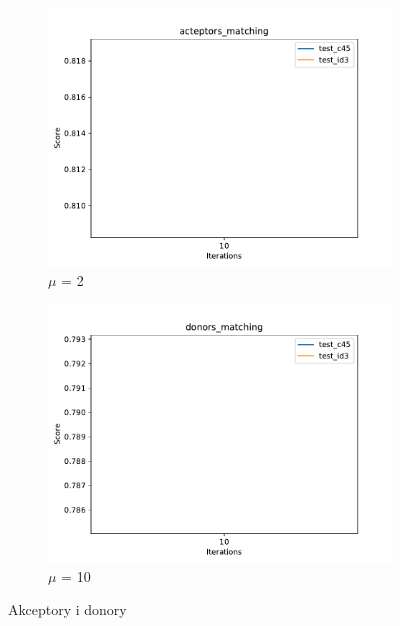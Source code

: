\begin{figure}[H]
    \centering 
    \begin{subfigure}[b]{0.49\linewidth}
        \includegraphics[width=\linewidth]{img/acteptors_matching.pdf}
        \caption{$\mu$ = 2}
    \end{subfigure}
    \begin{subfigure}[b]{0.49\linewidth}
        \includegraphics[width=\linewidth]{img/donors_matching.pdf}
        \caption{$\mu$ = 10}
    \end{subfigure}
    \caption{Akceptory i donory}
    \label{fig:picking}
\end{figure}

